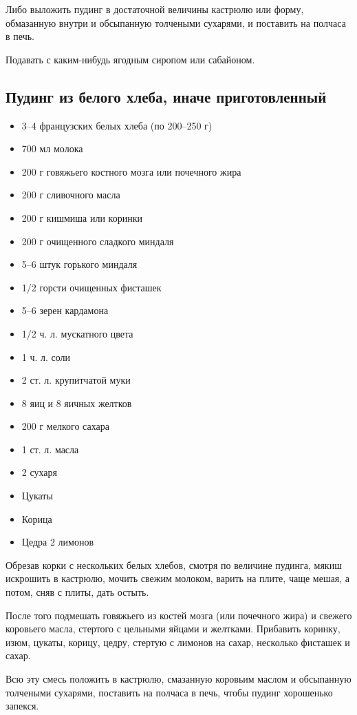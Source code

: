 Либо выложить пудинг в достаточной величины кастрюлю или форму, обмазанную внутри и обсыпанную толчеными сухарями, и поставить на полчаса в печь.

Подавать с каким-нибудь ягодным сиропом или сабайоном.

\subsection{Пудинг из белого хлеба, иначе приготовленный}

\begin{itemize}
	\item 3–4 французских белых хлеба (по 200–250 г) 
    \item 700 мл молока 
    \item 200 г говяжьего костного мозга или почечного жира 
    \item 200 г сливочного масла 
    \item 200 г кишмиша или коринки 
    \item 200 г очищенного сладкого миндаля 
    \item 5–6 штук горького миндаля 
    \item 1/2 горсти очищенных фисташек 
    \item 5–6 зерен кардамона 
    \item 1/2 ч. л. мускатного цвета 
    \item 1 ч. л. соли 
    \item 2 ст. л. крупитчатой муки 
    \item 8 яиц и 8 яичных желтков 
    \item 200 г мелкого сахара 
    \item 1 ст. л. масла 
    \item 2 сухаря 
    \item Цукаты 
    \item Корица
    \item Цедра 2 лимонов
\end{itemize}

Обрезав корки с нескольких белых хлебов, смотря по величине пудинга, мякиш искрошить в кастрюлю, мочить свежим молоком, варить на плите, чаще мешая, а потом, сняв с плиты, дать остыть.

После того подмешать говяжьего из костей мозга (или почечного жира) и свежего коровьего масла, стертого с цельными яйцами и желтками. Прибавить коринку, изюм, цукаты, корицу, цедру, стертую с лимонов на сахар, несколько фисташек и сахар.

Всю эту смесь положить в кастрюлю, смазанную коровьим маслом и обсыпанную толчеными сухарями, поставить на полчаса в печь, чтобы пудинг хорошенько запекся.

